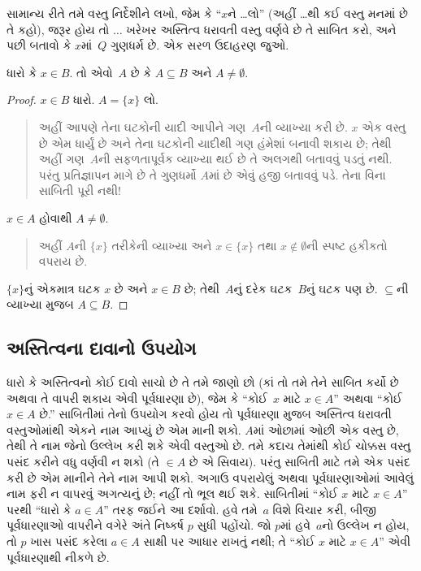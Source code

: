 સામાન્ય રીતે તમે વસ્તુ નિર્દેશીને લખો, જેમ કે ``$x$ને
\dots લો'' (અહીં \dots{}થી કઈ વસ્તુ મનમાં છે તે કહો), જરૂર
હોય તો $\dots$ ખરેખર અસ્તિત્વ ધરાવતી વસ્તુ વર્ણવે છે તે
સાબિત કરો, અને પછી બતાવો કે $x$માં~$Q$ ગુણધર્મ છે. એક
સરળ ઉદાહરણ જુઓ.

\begin{prop}
  ધારો કે $x \in B$. તો એવો~$A$ છે કે $A \subseteq
  B$ અને $A \neq \emptyset$.
\end{prop}

\begin{proof}
  $x \in B$ ધારો. $A = \{x\}$ લો.
  \begin{quote}
    અહીં આપણે તેના ઘટકોની યાદી આપીને ગણ~$A$ની
    વ્યાખ્યા કરી છે. $x$ એક વસ્તુ છે એમ ધાર્યું છે અને તેના
    ઘટકોની યાદીથી ગણ હંમેશાં બનાવી શકાય છે; તેથી અહીં
    ગણ~$A$ની સફળતાપૂર્વક વ્યાખ્યા થઈ છે તે અલગથી બતાવવું
    પડતું નથી. પરંતુ પ્રતિજ્ઞાપન માગે છે તે ગુણધર્મો $A$માં
    છે એવું હજી બતાવવું પડે. તેના વિના સાબિતી પૂરી નથી!{}
  \end{quote}
  $x \in A$ હોવાથી $A \neq \emptyset$.
  \begin{quote}
    અહીં $A$ની $\{x\}$ તરીકેની વ્યાખ્યા અને $x \in \{x\}$
    તથા $x \notin \emptyset$ની સ્પષ્ટ હકીકતો વપરાય છે.
  \end{quote}
  $\{x\}$નું એકમાત્ર ઘટક $x$ છે અને $x \in B$ છે;
  તેથી~$A$નું દરેક ઘટક~$B$નું ઘટક પણ છે.
  $\subseteq$ની વ્યાખ્યા મુજબ $A \subseteq B$.
\end{proof}

\subsection{અસ્તિત્વના દાવાનો ઉપયોગ}

ધારો કે અસ્તિત્વનો કોઈ દાવો સાચો છે તે તમે જાણો છો (કાં તો
તમે તેને સાબિત કર્યો છે અથવા તે વાપરી શકાય એવી પૂર્વધારણા છે),
જેમ કે ``કોઈ~$x$ માટે $x \in A$'' અથવા ``કોઈ $x \in A$
છે.'' સાબિતીમાં તેનો ઉપયોગ કરવો હોય તો પૂર્વધારણા મુજબ
અસ્તિત્વ ધરાવતી વસ્તુઓમાંથી એકને નામ આપ્યું છે એમ માની શકો.
$A$માં ઓછામાં ઓછી એક વસ્તુ છે, તેથી તે નામ જેનો ઉલ્લેખ
કરી શકે એવી વસ્તુઓ છે. તમે કદાચ તેમાંથી કોઈ ચોક્કસ વસ્તુ
પસંદ કરીને વધુ વર્ણવી ન શકો (તે $\in A$ છે એ સિવાય).
પરંતુ સાબિતી માટે તમે એક પસંદ કરી છે એમ માનીને તેને નામ
આપી શકો. અગાઉ વપરાયેલું અથવા પૂર્વધારણાઓમાં આવેલું નામ
ફરી ન વાપરવું અગત્યનું છે; નહીં તો ભૂલ થઈ શકે. સાબિતીમાં
``કોઈ $x$ માટે $x \in A$'' પરથી ``ધારો કે $a
\in A$'' તરફ જઈને આ દર્શાવો. હવે તમે~$a$ વિશે વિચાર કરી,
બીજી પૂર્વધારણાઓ વાપરીને વગેરે અંતે નિષ્કર્ષ $p$ સુધી પહોંચો.
જો $p$માં હવે~$a$નો ઉલ્લેખ ન હોય, તો $p$ ખાસ પસંદ કરેલા
$a \in A$ સાક્ષી પર આધાર રાખતું નથી; તે ``કોઈ $x$ માટે
$x \in A$'' એવી પૂર્વધારણાથી નીકળે છે.

